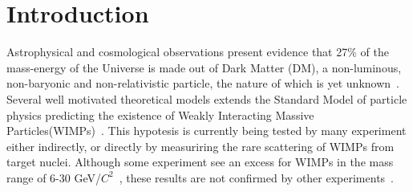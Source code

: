 \section{Introduction}

Astrophysical and cosmological observations present evidence that 27\% of the mass-energy of the Universe is made out of Dark Matter (DM), a non-luminous, non-baryonic and non-relativistic particle, the nature of which is yet unknown~\cite{Harvey1462}. Several well motivated theoretical models extends the Standard Model of particle physics predicting the existence of Weakly Interacting Massive Particles(WIMPs)~\cite{Bertone:2010zza}. This hypotesis is currently being tested by many experiment either indirectly, or directly by  measuriring the rare scattering of WIMPs from target nuclei. Although some experiment see an excess for WIMPs in the mass range of 6-30 GeV/$C^2$~\cite{DAMA,COGENT,CDMSlite,CREST}, these results are not confirmed by other experiments~\cite{xe100_run_combination,PANDAX,LUXnew}.


